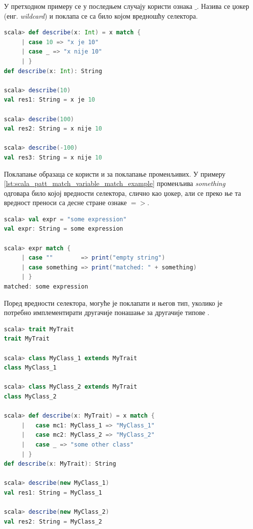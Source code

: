 \documentclass[12pt,oneside]{memoir}
\begin{document}
У претходном примеру се у последњем случају користи ознака $\_$. Назива се џокер (енг. \textit{wildcard}) и поклапа се са било којом вредношћу селектора.

\begin{lstlisting}[language=Scala, caption={Џокер у поклапању образаца}, label={lst:scala_patt_match_wildcard}]
scala> def describe(x: Int) = x match {
     | case 10 => "x je 10"
     | case _ => "x nije 10"
     | }
def describe(x: Int): String

scala> describe(10)
val res1: String = x je 10

scala> describe(100)
val res2: String = x nije 10

scala> describe(-100)
val res3: String = x nije 10
\end{lstlisting}

Поклапање образаца се користи и за поклапање променљивих. У примеру \ref{lst:scala_patt_match_variable_match_example} променљива \textit{something} одговара било којој вредности селектора, слично као џокер, али се преко ње та вредност преноси са десне стране ознаке $=>$. \cite{scala_prog}

\begin{lstlisting}[language=Scala, caption={Поклапање променљивих}, label={lst:scala_patt_match_variable_match_example}]
scala> val expr = "some expression"
val expr: String = some expression

scala> expr match {
     | case ""        => print("empty string")
     | case something => print("matched: " + something)
     | }
matched: some expression
\end{lstlisting}

Поред вредности селектора, могуће је поклапати и његов тип, уколико је потребно имплементирати другачије понашање за другачије типове .

\begin{lstlisting}[language=Scala, caption={Поклапање типова}, label={lst:scala_patt_match_types_example}]
scala> trait MyTrait
trait MyTrait

scala> class MyClass_1 extends MyTrait
class MyClass_1

scala> class MyClass_2 extends MyTrait
class MyClass_2

scala> def describe(x: MyTrait) = x match {
     |   case mc1: MyClass_1 => "MyClass_1"
     |   case mc2: MyClass_2 => "MyClass_2"
     |   case _ => "some other class"
     | }
def describe(x: MyTrait): String

scala> describe(new MyClass_1)
val res1: String = MyClass_1

scala> describe(new MyClass_2)
val res2: String = MyClass_2
\end{lstlisting}
\end{document}
